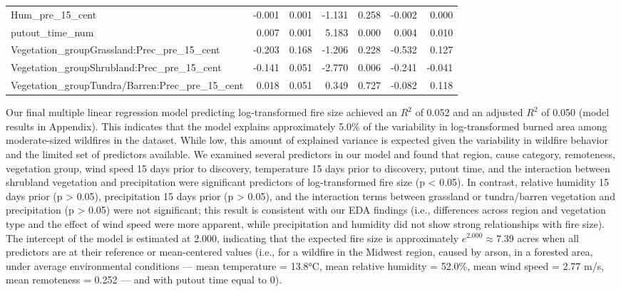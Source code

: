 \documentclass[
  letterpaper,
  DIV=11,
  numbers=noendperiod]{scrartcl}
\begin{document}
\begin{table}[!h]
\begin{tabular}{lrrrrrr}
\addlinespace
Hum\_pre\_15\_cent & -0.001 & 0.001 & -1.131 & 0.258 & -0.002 & 0.000\\
putout\_time\_num & 0.007 & 0.001 & 5.183 & 0.000 & 0.004 & 0.010\\
Vegetation\_groupGrassland:Prec\_pre\_15\_cent & -0.203 & 0.168 & -1.206 & 0.228 & -0.532 & 0.127\\
Vegetation\_groupShrubland:Prec\_pre\_15\_cent & -0.141 & 0.051 & -2.770 & 0.006 & -0.241 & -0.041\\
Vegetation\_groupTundra/Barren:Prec\_pre\_15\_cent & 0.018 & 0.051 & 0.349 & 0.727 & -0.082 & 0.118\\
\bottomrule
\end{tabular}
\endgroup{}
\end{table}

Our final multiple linear regression model predicting log-transformed
fire size achieved an \(R^{2}\) of 0.052 and an adjusted \(R^2\) of
0.050 (model results in Appendix). This indicates that the model
explains approximately 5.0\% of the variability in log-transformed
burned area among moderate-sized wildfires in the dataset. While low,
this amount of explained variance is expected given the variability in
wildfire behavior and the limited set of predictors available. We
examined several predictors in our model and found that region, cause
category, remoteness, vegetation group, wind speed 15 days prior to
discovery, temperature 15 days prior to discovery, putout time, and the
interaction between shrubland vegetation and precipitation were
significant predictors of log-transformed fire size (p \textless{}
0.05). In contrast, relative humidity 15 days prior (p \textgreater{}
0.05), precipitation 15 days prior (p \textgreater{} 0.05), and the
interaction terms between grassland or tundra/barren vegetation and
precipitation (p \textgreater{} 0.05) were not significant; this result
is consistent with our EDA findings (i.e., differences across region and
vegetation type and the effect of wind speed were more apparent, while
precipitation and humidity did not show strong relationships with fire
size). The intercept of the model is estimated at 2.000, indicating that
the expected fire size is approximately \(e^{2.000} \approx 7.39\) acres
when all predictors are at their reference or mean-centered values
(i.e., for a wildfire in the Midwest region, caused by arson, in a
forested area, under average environmental conditions --- mean
temperature = 13.8°C, mean relative humidity = 52.0\%, mean wind speed =
2.77 m/s, mean remoteness = 0.252 --- and with putout time equal to 0).
\end{document}
